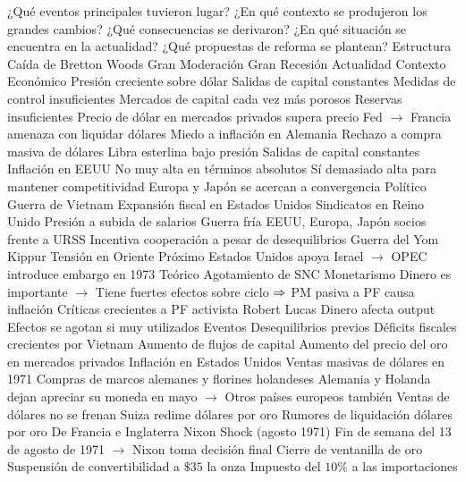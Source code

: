 \documentclass{nuevotema}
\begin{document}
\begin{esquemal}
			\3 ¿Qué eventos principales tuvieron lugar?
			\3 ¿En qué contexto se produjeron los grandes cambios?
			\3 ¿Qué consecuencias se derivaron?
			\3 ¿En qué situación se encuentra en la actualidad?
			\3 ¿Qué propuestas de reforma se plantean?
		\2 Estructura
			\3 Caída de Bretton Woods
			\3 Gran Moderación
			\3 Gran Recesión
			\3 Actualidad
	\1 
		\2 Contexto
			\3 Económico
				\4 Presión creciente sobre dólar
				\4[] Salidas de capital constantes
				\4[] Medidas de control insuficientes
				\4[] Mercados de capital cada vez más porosos
				\4[] Reservas insuficientes
				\4[] Precio de dólar en mercados privados supera precio Fed
				\4[] $\to$ Francia amenaza con liquidar dólares
				\4 Miedo a inflación en Alemania
				\4[] Rechazo a compra masiva de dólares
				\4 Libra esterlina bajo presión
				\4[] Salidas de capital constantes
				\4 Inflación en EEUU
				\4[] No muy alta en términos absolutos
				\4[] Sí demasiado alta para mantener competitividad
				\4 Europa y Japón se acercan a convergencia
			\3 Político
				\4 Guerra de Vietnam
				\4[] Expansión fiscal en Estados Unidos
				\4 Sindicatos en Reino Unido
				\4[] Presión a subida de salarios
				\4 Guerra fría
				\4[] EEUU, Europa, Japón socios frente a URSS
				\4[] Incentiva cooperación a pesar de desequilibrios
				\4 Guerra del Yom Kippur
				\4[] Tensión en Oriente Próximo
				\4[] Estados Unidos apoya Israel
				\4[] $\to$ OPEC introduce embargo en 1973
			\3 Teórico
				\4 Agotamiento de SNC
				\4 Monetarismo
				\4[] Dinero es importante
				\4[] $\to$ Tiene fuertes efectos sobre ciclo
				\4[] $\Rightarrow$ PM pasiva a PF causa inflación
				\4 Críticas crecientes a PF activista
				\4 Robert Lucas
				\4[] Dinero afecta output
				\4[] Efectos se agotan si muy utilizados
		\2 Eventos
			\3 Desequilibrios previos
				\4 Déficits fiscales crecientes por Vietnam
				\4 Aumento de flujos de capital
				\4 Aumento del precio del oro en mercados privados
				\4 Inflación en Estados Unidos
			\3 Ventas masivas de dólares en 1971
				\4 Compras de marcos alemanes y florines holandeses
				\4[] Alemania y Holanda dejan apreciar su moneda en mayo
				\4[] $\to$ Otros países europeos también
				\4 Ventas de dólares no se frenan
				\4 Suiza redime dólares por oro
				\4 Rumores de liquidación dólares por oro
				\4[] De Francia e Inglaterra
			\3 Nixon Shock (agosto 1971)
				\4 Fin de semana del 13 de agosto de 1971
				\4[] $\to$ Nixon toma decisión final
				\4 Cierre de ventanilla de oro
				\4[] Suspensión de convertibilidad a $\$35$ la onza
				\4 Impuesto del $10\%$ a las importaciones

\end{esquemal}
\end{document}
